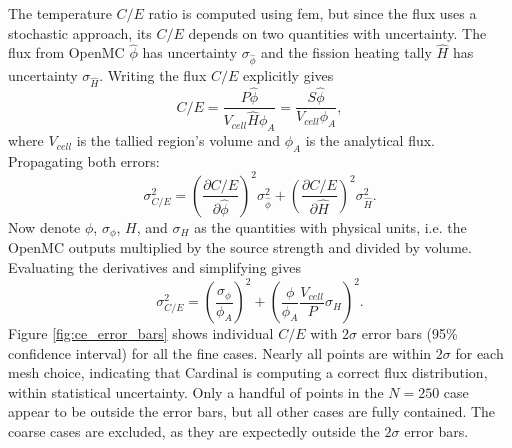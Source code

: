 \documentclass[letterpaper]{mc2023}
\begin{document}
The temperature $C/E$ ratio is computed using \gls{fem}, but since the flux uses a stochastic approach, its $C/E$ depends on two quantities with
uncertainty. The flux from OpenMC $\hat{\phi}$ has uncertainty $\sigma_{\hat{\phi}}$ and the fission heating tally $\hat{H}$ has uncertainty
$\sigma_{\hat{H}}$. Writing the flux $C/E$ explicitly gives
\begin{equation}\label{eq:CE_formula}
    C/E =
    \frac{P\hat{\phi}}{V_{cell}\hat{H}\phi_{A}} = \frac{S\hat{\phi}}{V_{cell}\phi_{A}},
\end{equation}
where $V_{cell}$ is the tallied region's volume and $\phi_{A}$ is the analytical flux. Propagating both errors:
\begin{equation}\label{eq:sigma_ce_def}
    \sigma_{C/E}^2 =
    \left( \frac{\partial C/E}{\partial\hat{\phi}} \right)^2 \sigma_{\hat{\phi}}^2  +
     \left( \frac{\partial C/E}{\partial \hat{H}} \right)^2 \sigma_{\hat{H}}^2 .
\end{equation}
Now denote $\phi$, $\sigma_{\phi}$, $H$, and $\sigma_{H}$ as the quantities with physical units, i.e. the OpenMC outputs multiplied by the source
strength and divided by volume. Evaluating the derivatives and simplifying gives
\begin{equation}\label{eq:sigma_CE_physical_units}
    \sigma_{C/E}^2 =
    \left(\frac{\sigma_{\phi} }{\phi_{A}} \right)^2 +
     \left( \frac{\phi}{\phi_{A}}\frac{V_{cell}}{P}\sigma_{H} \right)^2.
\end{equation}
Figure \ref{fig:ce_error_bars} shows individual $C/E$ with $2\sigma$ error bars (95\% confidence interval) for all the fine cases. Nearly all points
are within $2\sigma$ for each mesh choice, indicating that Cardinal is computing a correct flux distribution, within statistical uncertainty. Only a
handful of points in the $N=250$ case appear to be outside the error bars, but all other cases are fully contained. The coarse cases are excluded, as
they are expectedly outside the $2\sigma$ error bars.
\end{document}
